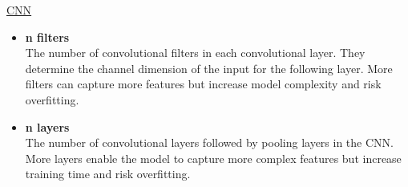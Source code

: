 \documentclass[a4paper,12pt]{report}
\begin{document}
\begin{minipage}{\textwidth}
\underline{CNN}
\begin{itemize}
  \item \textbf{n filters} \\
  The number of convolutional filters in each convolutional layer. They determine the channel dimension of the input for the following layer. More filters can capture more features but increase model complexity and risk overfitting.

  \item \textbf{n layers} \\
  The number of convolutional layers followed by pooling layers in the CNN. More layers enable the model to capture more complex features but increase training time and risk overfitting.

\end{itemize}
\end{minipage}
\end{document}
